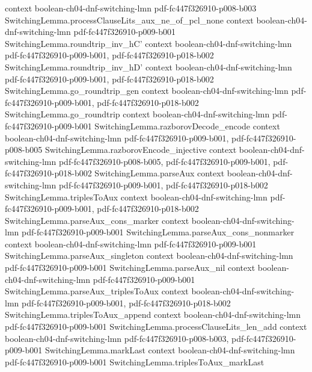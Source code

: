 \begin{lemma}
  {context}
  {boolean-ch04-dnf-switching-lmn}
  {pdf-fc447f326910-p008-b003}
\proofstep
  {SwitchingLemma.processClauseLits_aux_ne_of_pcl_none}
  {context}
  {boolean-ch04-dnf-switching-lmn}
  {pdf-fc447f326910-p009-b001}
\proofstep
  {SwitchingLemma.roundtrip_inv_hC'}
  {context}
  {boolean-ch04-dnf-switching-lmn}
  {pdf-fc447f326910-p009-b001,
    pdf-fc447f326910-p018-b002}
\proofstep
  {SwitchingLemma.roundtrip_inv_hD'}
  {context}
  {boolean-ch04-dnf-switching-lmn}
  {pdf-fc447f326910-p009-b001,
    pdf-fc447f326910-p018-b002}
\proofstep
  {SwitchingLemma.go_roundtrip_gen}
  {context}
  {boolean-ch04-dnf-switching-lmn}
  {pdf-fc447f326910-p009-b001,
    pdf-fc447f326910-p018-b002}
\proofstep
  {SwitchingLemma.go_roundtrip}
  {context}
  {boolean-ch04-dnf-switching-lmn}
  {pdf-fc447f326910-p009-b001}
\proofstep
  {SwitchingLemma.razborovDecode_encode}
  {context}
  {boolean-ch04-dnf-switching-lmn}
  {pdf-fc447f326910-p009-b001,
    pdf-fc447f326910-p008-b005}
\proofstep
  {SwitchingLemma.razborovEncode_injective}
  {context}
  {boolean-ch04-dnf-switching-lmn}
  {pdf-fc447f326910-p008-b005,
    pdf-fc447f326910-p009-b001,
    pdf-fc447f326910-p018-b002}
\proofstep
  {SwitchingLemma.parseAux}
  {context}
  {boolean-ch04-dnf-switching-lmn}
  {pdf-fc447f326910-p009-b001,
    pdf-fc447f326910-p018-b002}
\proofstep
  {SwitchingLemma.triplesToAux}
  {context}
  {boolean-ch04-dnf-switching-lmn}
  {pdf-fc447f326910-p009-b001,
    pdf-fc447f326910-p018-b002}
\proofstep
  {SwitchingLemma.parseAux_cons_marker}
  {context}
  {boolean-ch04-dnf-switching-lmn}
  {pdf-fc447f326910-p009-b001}
\proofstep
  {SwitchingLemma.parseAux_cons_nonmarker}
  {context}
  {boolean-ch04-dnf-switching-lmn}
  {pdf-fc447f326910-p009-b001}
\proofstep
  {SwitchingLemma.parseAux_singleton}
  {context}
  {boolean-ch04-dnf-switching-lmn}
  {pdf-fc447f326910-p009-b001}
\proofstep
  {SwitchingLemma.parseAux_nil}
  {context}
  {boolean-ch04-dnf-switching-lmn}
  {pdf-fc447f326910-p009-b001}
\proofstep
  {SwitchingLemma.parseAux_triplesToAux}
  {context}
  {boolean-ch04-dnf-switching-lmn}
  {pdf-fc447f326910-p009-b001,
    pdf-fc447f326910-p018-b002}
\proofstep
  {SwitchingLemma.triplesToAux_append}
  {context}
  {boolean-ch04-dnf-switching-lmn}
  {pdf-fc447f326910-p009-b001}
\proofstep
  {SwitchingLemma.processClauseLits_len_add}
  {context}
  {boolean-ch04-dnf-switching-lmn}
  {pdf-fc447f326910-p008-b003,
    pdf-fc447f326910-p009-b001}
\proofstep
  {SwitchingLemma.markLast}
  {context}
  {boolean-ch04-dnf-switching-lmn}
  {pdf-fc447f326910-p009-b001}
\proofstep
  {SwitchingLemma.triplesToAux_markLast}

\end{lemma}
